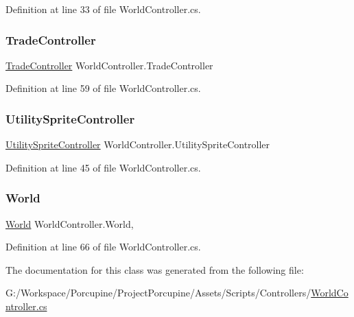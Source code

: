 Definition at line 33 of file World\+Controller.\+cs.

\mbox{\label{class_world_controller_a4a1277c140cc46e9578809ecbd4c192d}} 
\subsubsection{\texorpdfstring{Trade\+Controller}{TradeController}}
{\footnotesize\ttfamily \hyperlink{class_trade_controller}{Trade\+Controller} World\+Controller.\+Trade\+Controller\hspace{0.3cm}{\ttfamily [get]}}



Definition at line 59 of file World\+Controller.\+cs.

\mbox{\label{class_world_controller_ade5c8157ae83db0367c11f9e8bbb5fb9}} 
\subsubsection{\texorpdfstring{Utility\+Sprite\+Controller}{UtilitySpriteController}}
{\footnotesize\ttfamily \hyperlink{class_utility_sprite_controller}{Utility\+Sprite\+Controller} World\+Controller.\+Utility\+Sprite\+Controller\hspace{0.3cm}{\ttfamily [get]}}



Definition at line 45 of file World\+Controller.\+cs.

\mbox{\label{class_world_controller_aa3b61545a41730beea4b3d0dfedb0574}} 
\subsubsection{\texorpdfstring{World}{World}}
{\footnotesize\ttfamily \hyperlink{class_world}{World} World\+Controller.\+World\hspace{0.3cm}{\ttfamily [get]}, {}}



Definition at line 66 of file World\+Controller.\+cs.



The documentation for this class was generated from the following file\+:\begin{DoxyCompactItemize}
\item 
G\+:/\+Workspace/\+Porcupine/\+Project\+Porcupine/\+Assets/\+Scripts/\+Controllers/\hyperlink{_world_controller_8cs}{World\+Controller.\+cs}\end{DoxyCompactItemize}
